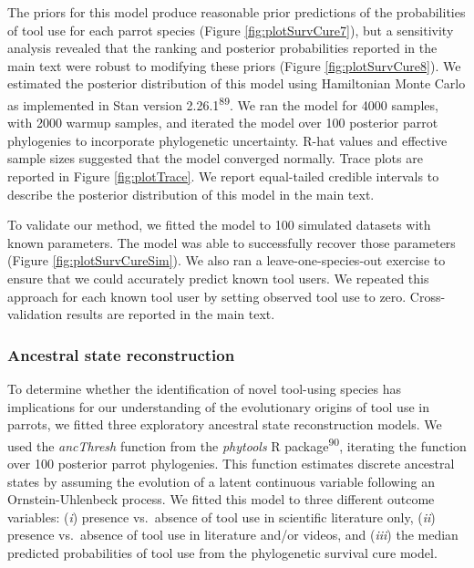 \documentclass[
  man, donotrepeattitle,floatsintext]{apa6}
\begin{document}
The priors for this model produce reasonable prior predictions of the
probabilities of tool use for each parrot species (Figure
\ref{fig:plotSurvCure7}), but a sensitivity analysis revealed that the ranking
and posterior probabilities reported in the main text were robust to modifying
these priors (Figure \ref{fig:plotSurvCure8}). We estimated the
posterior distribution of this model using Hamiltonian Monte Carlo as
implemented in Stan version 2.26.1\textsuperscript{89}. We ran the model for 4000
samples, with 2000 warmup samples, and iterated the model over 100 posterior
parrot phylogenies to incorporate phylogenetic uncertainty. R-hat values and
effective sample sizes suggested that the model converged normally. Trace plots
are reported in Figure \ref{fig:plotTrace}. We report
equal-tailed credible intervals to describe the posterior distribution of this
model in the main text.

To validate our method, we fitted the model to 100 simulated datasets with known
parameters. The model was able to successfully recover those parameters
(Figure \ref{fig:plotSurvCureSim}). We also ran a
leave-one-species-out exercise to ensure that we could accurately predict known
tool users. We repeated this approach for each known tool user by setting
observed tool use to zero. Cross-validation results are reported in the main
text.

\hypertarget{ancestral-state-reconstruction}{%
\subsubsection{Ancestral state reconstruction}\label{ancestral-state-reconstruction}}

To determine whether the identification of novel tool-using species has
implications for our understanding of the evolutionary origins of tool use in
parrots, we fitted three exploratory ancestral state reconstruction models. We
used the \emph{ancThresh} function from the \emph{phytools} R package\textsuperscript{90},
iterating the function over 100 posterior parrot phylogenies. This function
estimates discrete ancestral states by assuming the evolution of a latent
continuous variable following an Ornstein-Uhlenbeck process. We fitted this
model to three different outcome variables: (\emph{i}) presence vs.~absence of tool
use in scientific literature only, (\emph{ii}) presence vs.~absence of tool use in
literature and/or videos, and (\emph{iii}) the median predicted probabilities of tool
use from the phylogenetic survival cure model.
\end{document}
